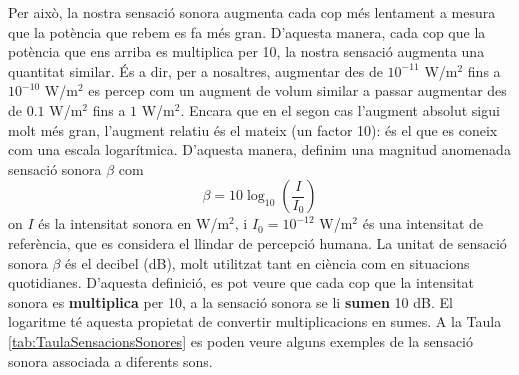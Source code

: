 \documentclass[12pt]{book}
\begin{document}
Per això, la nostra sensació sonora augmenta cada cop més lentament a mesura que la potència que rebem es fa més gran. D'aquesta manera, cada cop que la potència que ens arriba es multiplica per 10, la nostra sensació augmenta una quantitat similar. És a dir, per a nosaltres, augmentar des de $10^{-11}$ W/m$^2$ fins a $10^{-10}$ W/m$^2$ es percep com un augment de volum similar a passar augmentar des de $0.1$ W/m$^2$ fins a $1$ W/m$^2$. Encara que en el segon cas l'augment absolut sigui molt més gran, l'augment relatiu és el mateix (un factor 10): és el que es coneix com una escala logarítmica. D'aquesta manera, definim una magnitud anomenada sensació sonora $\beta$ com
%
\begin{equation}
    \boxed{\beta = 10 \log_{10} \left(\frac{I}{I_0}\right)}
\end{equation}
%
on $I$ és la intensitat sonora en W/m$^2$, i $I_0 = 10^{-12}$ W/m$^2$ és una intensitat de referència, que es considera el llindar de percepció humana. La unitat de sensació sonora $\beta$ és el decibel (dB), molt utilitzat tant en ciència com en situacions quotidianes. D'aquesta definició, es pot veure que cada cop que la intensitat sonora es {\bf multiplica} per 10, a la sensació sonora se li {\bf sumen} 10 dB. El logaritme té aquesta propietat de convertir multiplicacions en sumes. A la Taula \ref{tab:TaulaSensacionsSonores} es poden veure alguns exemples de la sensació sonora associada a diferents sons.
%
\end{document}
